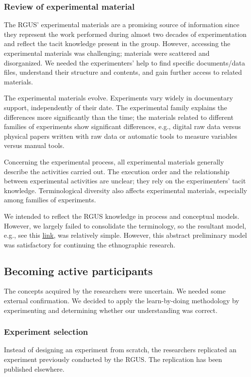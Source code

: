 \subsubsection{Review of experimental material}\label{subsubsec-review-experimental-material}
The RGUS' experimental materials are a promising source of information since they represent the work performed during almost two decades of experimentation and reflect the tacit knowledge \cite{Polanyi-1996-tacit-k} present in the group. However, accessing the experimental materials was challenging; materials were scattered and disorganized. We needed the experimenters' help to find specific documents/data files, understand their structure and contents, and gain further access to related materials.

The experimental materials evolve. Experiments vary widely in documentary support, independently of their date. The experimental family explains the differences more significantly than the time; the materials related to different families of experiments show significant differences, e.g., digital raw data versus physical papers written with raw data or automatic tools to measure variables versus manual tools.

Concerning the experimental process, all experimental materials generally describe the activities carried out. The execution order and the relationship between experimental activities are unclear; they rely on the experimenters' tacit knowledge. Terminological diversity also affects experimental materials, especially among families of experiments.

We intended to reflect the RGUS knowledge in process and conceptual models. However, we largely failed to consolidate the terminology, so the resultant model, e.g., see this 
\href{https://zenodo.org/record/7093417#.YyjHb-zMLUI}{\ul{link}}, was relatively simple. However, this abstract preliminary model was satisfactory for continuing the ethnographic research.

\subsection{Becoming active participants}\label{replication}
The concepts acquired by the researchers were uncertain. We needed some external confirmation. We decided to apply the learn-by-doing methodology \cite{mendoza-2019-learn-by-doing-methodology} by experimenting and determining whether our understanding was correct.

\subsubsection{Experiment selection}
Instead of designing an experiment from scratch, the researchers replicated an experiment previously conducted by the RGUS. The replication has been published elsewhere.

